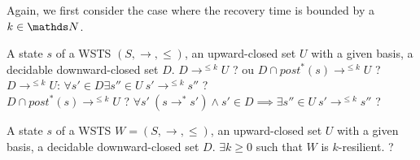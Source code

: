 
%
%

Again, we first consider the case where the recovery time is bounded by a $k \in \N$.

{A state $s$ of a WSTS $(S,\rightarrow, \leq)$, an upward-closed set $U$ with a given basis, a decidable downward-closed set $D$.}
{$D \longrightarrow^{\leq k} U$ ?  ou $D \cap post^*(s) \longrightarrow^{\leq k} U$ ?  \newline}
%
%
$D \longrightarrow^{\leq k} U$: $\forall s' \in D \exists s'' \in U ~ s' \rightarrow^{\leq k} s''$ ?\\
%
$D \cap post^*(s) \longrightarrow^{\leq k} U$ ?
%
$\forall s' ~ (s \rightarrow^* s') \wedge s' \in D  \implies \exists s'' \in U ~ s' \rightarrow^{\leq k} s''$ ?





{A state $s$ of a WSTS $W=(S,\rightarrow, \leq)$, an upward-closed set $U$ with a given basis, a decidable downward-closed set $D$.}
{$\exists k \geq 0$ such that $W$ is $k$-resilient. ?\newline}

